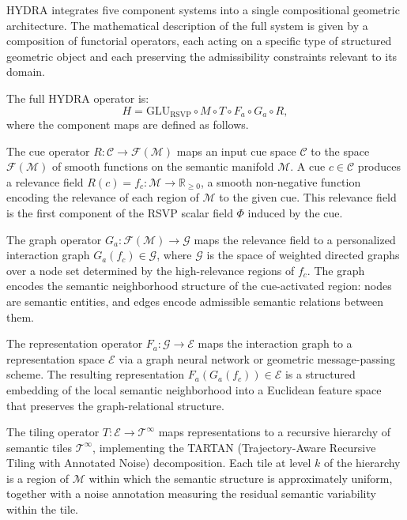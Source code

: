 \documentclass[12pt, a4paper, openany]{book}
\theoremstyle{plain}
\theoremstyle{definition}
\theoremstyle{remark}
\begin{document}
HYDRA integrates five component systems into a single compositional geometric architecture. The mathematical description of the full system is given by a composition of functorial operators, each acting on a specific type of structured geometric object and each preserving the admissibility constraints relevant to its domain.

The full HYDRA operator is:
\begin{equation}\label{eq:hydra}
H = \mathrm{GLU}_{\mathrm{RSVP}} \circ M \circ T \circ F_a \circ G_a \circ R,
\end{equation}
where the component maps are defined as follows.

The cue operator $R: \mathcal{C} \to \mathcal{F}(\mathcal{M})$ maps an input cue space $\mathcal{C}$ to the space $\mathcal{F}(\mathcal{M})$ of smooth functions on the semantic manifold $\mathcal{M}$. A cue $c \in \mathcal{C}$ produces a relevance field $R(c) = f_c: \mathcal{M} \to \mathbb{R}_{\geq 0}$, a smooth non-negative function encoding the relevance of each region of $\mathcal{M}$ to the given cue. This relevance field is the first component of the RSVP scalar field $\Phi$ induced by the cue.

The graph operator $G_a: \mathcal{F}(\mathcal{M}) \to \mathcal{G}$ maps the relevance field to a personalized interaction graph $G_a(f_c) \in \mathcal{G}$, where $\mathcal{G}$ is the space of weighted directed graphs over a node set determined by the high-relevance regions of $f_c$. The graph encodes the semantic neighborhood structure of the cue-activated region: nodes are semantic entities, and edges encode admissible semantic relations between them.

The representation operator $F_a: \mathcal{G} \to \mathcal{E}$ maps the interaction graph to a representation space $\mathcal{E}$ via a graph neural network or geometric message-passing scheme. The resulting representation $F_a(G_a(f_c)) \in \mathcal{E}$ is a structured embedding of the local semantic neighborhood into a Euclidean feature space that preserves the graph-relational structure.

The tiling operator $T: \mathcal{E} \to \mathcal{T}^\infty$ maps representations to a recursive hierarchy of semantic tiles $\mathcal{T}^\infty$, implementing the TARTAN (Trajectory-Aware Recursive Tiling with Annotated Noise) decomposition. Each tile at level $k$ of the hierarchy is a region of $\mathcal{M}$ within which the semantic structure is approximately uniform, together with a noise annotation measuring the residual semantic variability within the tile.
\end{document}
